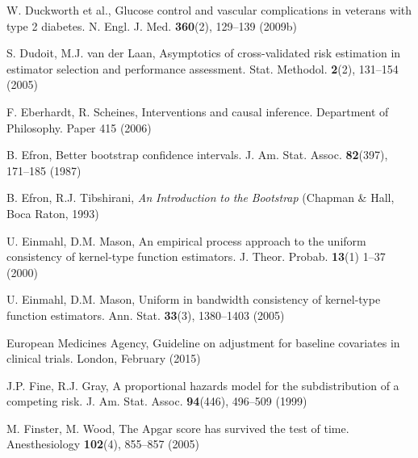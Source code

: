 \begin{list}{}{\setlength{\leftmargin}{2.1em}\setlength{\labelwidth}{0pt}
  \setlength{\labelsep}{0pt}\setlength{\itemindent}{-2.1em}
  \setlength{\parsep}{0pt}\setlength{\itemsep}{2pt}\setlength{\topsep}{0pt}}
\item\label{refentry:REF096}W. Duckworth et al., Glucose control and vascular complications in veterans with type 2 diabetes. N. Engl. J. Med. \textbf{360}(2), 129--139 (2009b)\label{refend:REF096}
\item\label{refentry:REF097}S. Dudoit, M.J. van der Laan, Asymptotics of cross-validated risk estimation in estimator selection and performance assessment. Stat. Methodol. \textbf{2}(2), 131--154 (2005)\label{refend:REF097}
\item\label{refentry:REF098}F. Eberhardt, R. Scheines, Interventions and causal inference. Department of Philosophy. Paper 415 (2006)\label{refend:REF098}
\item\label{refentry:REF099}B. Efron, Better bootstrap confidence intervals. J. Am. Stat. Assoc. \textbf{82}(397), 171--185 (1987)\label{refend:REF099}
\item\label{refentry:REF100}B. Efron, R.J. Tibshirani, \textit{An} \textit{Introduction} \textit{to} \textit{the} \textit{Bootstrap} (Chapman \& Hall, Boca Raton, 1993)\label{refend:REF100}
\item\label{refentry:REF101}U. Einmahl, D.M. Mason, An empirical process approach to the uniform consistency of kernel-type function estimators. J. Theor. Probab. \textbf{13}(1) 1--37 (2000)\label{refend:REF101}
\item\label{refentry:REF102}U. Einmahl, D.M. Mason, Uniform in bandwidth consistency of kernel-type function estimators. Ann. Stat. \textbf{33}(3), 1380--1403 (2005)\label{refend:REF102}
\item\label{refentry:REF103}European Medicines Agency, Guideline on adjustment for baseline covariates in clinical trials. London, February (2015)\label{refend:REF103}
\item\label{refentry:REF104}J.P. Fine, R.J. Gray, A proportional hazards model for the subdistribution of a competing risk. J. Am. Stat. Assoc. \textbf{94}(446), 496--509 (1999)\label{refend:REF104}
\item\label{refentry:REF105}M. Finster, M. Wood, The Apgar score has survived the test of time. Anesthesiology \textbf{102}(4), 855--857 (2005)\label{refend:REF105}

\end{list}
